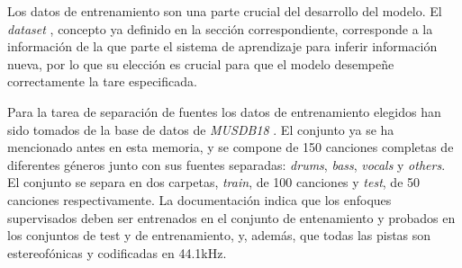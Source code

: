 Los datos de entrenamiento son una parte crucial del desarrollo del modelo. El \textit{dataset} , concepto ya definido en la sección correspondiente, corresponde a la información de la que parte el sistema de aprendizaje para inferir información nueva, por lo que su elección es crucial para que el modelo desempeñe correctamente la tare especificada.

Para la tarea de separación de fuentes los datos de entrenamiento elegidos han sido tomados de la base de datos de \textit{MUSDB18} \cite{musdb18}. El conjunto ya se ha mencionado antes en esta memoria, y se compone de 150 canciones completas de diferentes géneros junto con sus fuentes separadas: \textit{drums}, \textit{bass}, \textit{vocals} y \textit{others}.
El conjunto se separa en dos carpetas, \textit{train}, de 100 canciones y \textit{test}, de 50 canciones respectivamente. La documentación indica que los enfoques supervisados deben ser entrenados en el conjunto de entenamiento y probados en los conjuntos de test y de entrenamiento, y, además, que todas las pistas son estereofónicas y codificadas en 44.1kHz.